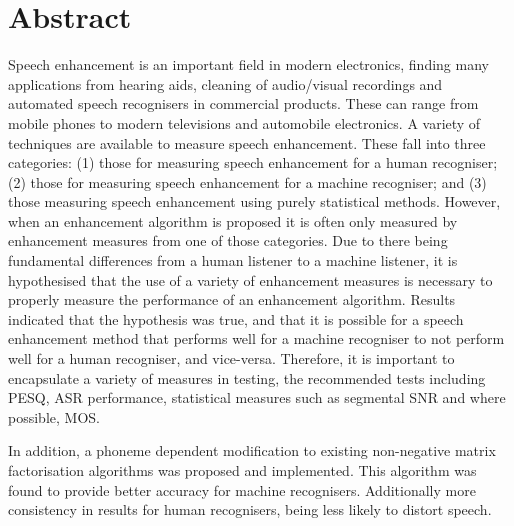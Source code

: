 
\chapter*{Abstract}

%

%
Speech enhancement is an important field in modern electronics, finding
many applications from hearing aids, cleaning of audio/visual recordings
and automated speech recognisers in commercial products. These can
range from mobile phones to modern televisions and automobile electronics.
A variety of techniques are available to measure speech enhancement.
These fall into three categories: (1) those for measuring speech enhancement
for a human recogniser; (2) those for measuring speech enhancement
for a machine recogniser; and (3) those measuring speech enhancement
using purely statistical methods. However, when an enhancement algorithm
is proposed it is often only measured by enhancement measures from
one of those categories. Due to there being fundamental differences
from a human listener to a machine listener, it is hypothesised that
the use of a variety of enhancement measures is necessary to properly
measure the performance of an enhancement algorithm. Results indicated
that the hypothesis was true, and that it is possible for a speech
enhancement method that performs well for a machine recogniser to
not perform well for a human recogniser, and vice-versa. Therefore,
it is important to encapsulate a variety of measures in testing, the
recommended tests including PESQ, ASR performance, statistical measures
such as segmental SNR and where possible, MOS.

In addition, a phoneme dependent modification to existing non-negative
matrix factorisation algorithms was proposed and implemented. This
algorithm was found to provide better accuracy for machine recognisers.
Additionally more consistency in results for human recognisers, being
less likely to distort speech.

